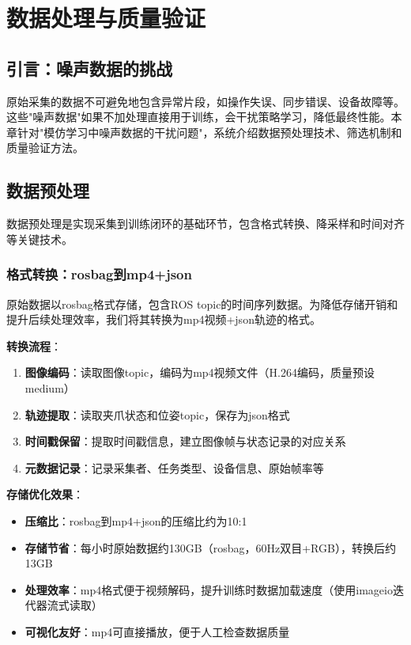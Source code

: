 \section{数据处理与质量验证}

\subsection{引言：噪声数据的挑战}

原始采集的数据不可避免地包含异常片段，如操作失误、同步错误、设备故障等。这些"噪声数据"如果不加处理直接用于训练，会干扰策略学习，降低最终性能。本章针对"模仿学习中噪声数据的干扰问题"，系统介绍数据预处理技术、筛选机制和质量验证方法。

\subsection{数据预处理}

数据预处理是实现采集到训练闭环的基础环节，包含格式转换、降采样和时间对齐等关键技术。

\subsubsection{格式转换：rosbag到mp4+json}

原始数据以rosbag格式存储，包含ROS topic的时间序列数据。为降低存储开销和提升后续处理效率，我们将其转换为mp4视频+json轨迹的格式。

\textbf{转换流程}：
\begin{enumerate}[leftmargin=2em]
    \item \textbf{图像编码}：读取图像topic，编码为mp4视频文件（H.264编码，质量预设medium）
    \item \textbf{轨迹提取}：读取夹爪状态和位姿topic，保存为json格式
    \item \textbf{时间戳保留}：提取时间戳信息，建立图像帧与状态记录的对应关系
    \item \textbf{元数据记录}：记录采集者、任务类型、设备信息、原始帧率等
\end{enumerate}

\textbf{存储优化效果}：
\begin{itemize}[leftmargin=2em]
    \item \textbf{压缩比}：rosbag到mp4+json的压缩比约为10:1
    \item \textbf{存储节省}：每小时原始数据约130GB（rosbag，60Hz双目+RGB），转换后约13GB
    \item \textbf{处理效率}：mp4格式便于视频解码，提升训练时数据加载速度（使用imageio迭代器流式读取）
    \item \textbf{可视化友好}：mp4可直接播放，便于人工检查数据质量
\end{itemize}

